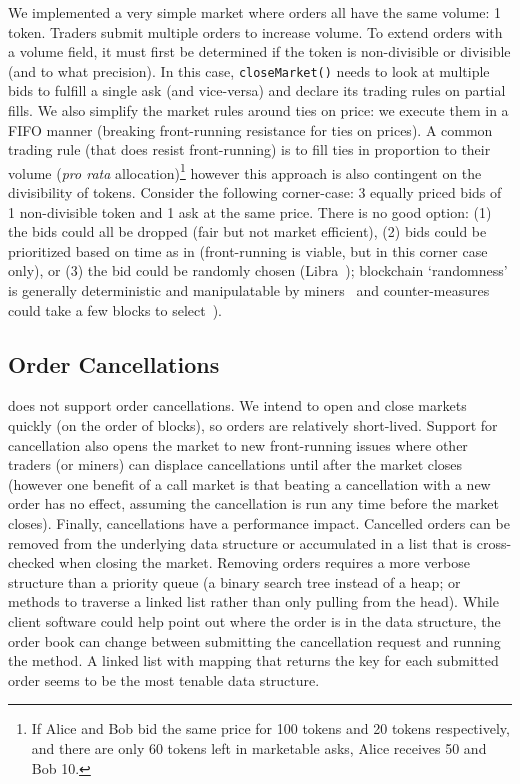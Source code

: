 We implemented a very simple market where orders all have the same volume: 1 token. Traders submit multiple orders to increase volume. To extend orders with a volume field, it must first be determined if the token is non-divisible or divisible (and to what precision). In this case, \texttt{closeMarket()} needs to look at multiple bids to fulfill a single ask (and vice-versa) and declare its trading rules on partial fills. We also simplify the market rules around ties on price: we execute them in a FIFO manner (breaking front-running resistance for ties on prices). A common trading rule (that does resist front-running) is to fill ties in proportion to their volume (\ie \textit{pro rata} allocation)\footnote{If Alice and Bob bid the same price for 100 tokens and 20 tokens respectively, and there are only 60 tokens left in marketable asks, Alice receives 50 and Bob 10.} however this approach is also contingent on the divisibility of tokens. Consider the following corner-case: 3 equally priced bids of 1 non-divisible token and 1 ask at the same price. There is no good option: (1) the bids could all be dropped (fair but not market efficient), (2) bids could be prioritized based on time as in \cm (front-running is viable, but in this corner case only), or (3) the bid could be randomly chosen (\cf Libra~\cite{mavroudis2019libra}); blockchain `randomness' is generally deterministic and manipulatable by miners~\cite{bonneau2015random,buenz2017proofs} and counter-measures could take a few blocks to select~\cite{boneh2018verifiable}).

\subsection{Order Cancellations}

\cm does not support order cancellations. We intend to open and close markets quickly (on the order of blocks), so orders are relatively short-lived. Support for cancellation also opens the market to new front-running issues where other traders (or miners) can displace cancellations until after the market closes (however one benefit of a call market is that beating a cancellation with a new order has no effect, assuming the cancellation is run any time before the market closes). Finally, cancellations have a performance impact. Cancelled orders can be removed from the underlying data structure   or accumulated in a list that is cross-checked when closing the market. Removing orders requires a more verbose structure than a priority queue (\eg a binary search tree instead of a heap; or methods to traverse a linked list rather than only pulling from the head). While client software could help point out where the order is in the data structure, the order book can change between submitting the cancellation request and running the method. A linked list with mapping that returns the key for each submitted order seems to be the most tenable data structure. 

